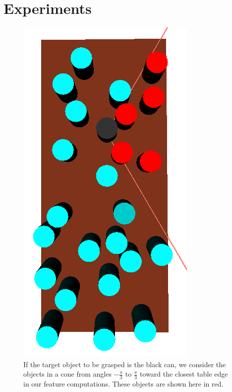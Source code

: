 \section{Experiments}
\begin{figure}[t]
  \centering
    \includegraphics[scale=0.3,angle=90]{images/feature_cone.png}
  \caption{\small{If the target object to be grasped is the black can, we consider the objects
in a cone from angles $-\frac{\pi}{3}$ to $\frac{\pi}{3}$ toward the closest table edge in
our feature computations. These objects are shown here in red.}}
  \label{fig:cone}
\end{figure}

